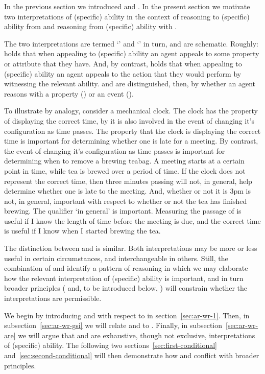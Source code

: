 \begin{note}
  In the previous section we introduced \gsi{-} and .
  In the present section we motivate two interpretations of (specific) ability in the context of reasoning to (specific) ability from \gsi{} and reasoning from (specific) ability with .

  The two interpretations are termed `\AR{}' and `\WR{}' in turn, and are schematic.
  Roughly:
  \AR{} holds that when appealing to (specific) ability an agent appeals to some property or attribute that they have.
  And, by contrast, \WR{} holds that when appealing to (specific) ability an agent appeals to the action that they would perform by witnessing the relevant ability.
  \AR{} and \WR{} are distinguished, then, by whether an agent reasons with a property (\AR{}) or an event (\WR{}).

  To illustrate by analogy, consider a mechanical clock.
  The clock has the property of displaying the correct time, by it is also involved in the event of changing it's configuration as time passes.
  The property that the clock is displaying the correct time is important for determining whether one is late for a meeting.
  By contrast, the event of changing it's configuration as time passes is important for determining when to remove a brewing teabag.
  A meeting starts at a certain point in time, while tea is brewed over a period of time.
  If the clock does not represent the correct time, then three minutes passing will not, in general, help determine whether one is late to the meeting.
  And, whether or not it is 3pm is not, in general, important with respect to whether or not the tea has finished brewing.
  The qualifier `in general' is important.
  Measuring the passage of is useful if I know the length of time before the meeting is due, and the correct time is useful if I know when I started brewing the tea.

  The distinction between \AR{} and \WR{} is similar.
  Both interpretations may be more or less useful in certain circumstances, and interchangeable in others.
  Still, the combination of \gsi{} and  identify a pattern of reasoning in which we may elaborate how the relevant interpretation of (specific) ability is important, and in turn broader principles (\ESU{} and, to be introduced below, \nI{}) will constrain whether the interpretations are permissible.

  We begin by introducing \AR{} and \WR{} with respect to  in section~\ref{sec:ar-wr-1}.
  Then, in subsection~\ref{sec:ar-wr-gsi} we will relate \AR{} and \WR{} to \gsi{}.
  Finally, in subsection~\ref{sec:ar-wr-are} we will argue that \AR{} and \WR{} are exhaustive, though not exclusive, interpretations of (specific) ability.
  The following two sections~\ref{sec:first-conditional} and~\ref{sec:second-conditional} will then demonstrate how \WR{} and \AR{} conflict with broader principles.
\end{note}

